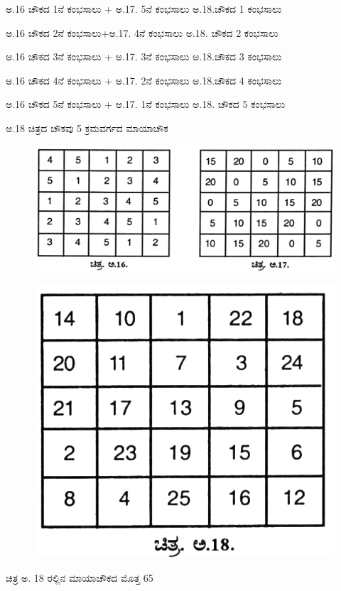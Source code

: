 ಅ.16 ಚೌಕದ 1ನೆ ಕಂಭಸಾಲು + ಅ.17. 5ನೆ ಕಂಭಸಾಲು ಅ.18.ಚೌಕದ 1 ಕಂಭಸಾಲು

ಅ.16 ಚೌಕದ 2ನೆ ಕಂಭಸಾಲು+ಅ.17. 4ನೆ ಕಂಭಸಾಲು ಅ.18. ಚೌಕದ 2 ಕಂಭಸಾಲು

ಅ.16 ಚೌಕದ 3ನೆ ಕಂಭಸಾಲು + ಅ.17. 3ನೆ ಕಂಭಸಾಲು ಅ.18.ಚೌಕದ 3 ಕಂಭಸಾಲು

ಅ.16 ಚೌಕದ 4ನೆ ಕಂಭಸಾಲು + ಅ.17. 2ನೆ ಕಂಭಸಾಲು ಅ.18.ಚೌಕದ 4 ಕಂಭಸಾಲು

ಅ.16 ಚೌಕದ 5ನೆ ಕಂಭಸಾಲು + ಅ.17. 1ನೆ ಕಂಭಸಾಲು ಅ.18. ಚೌಕದ 5 ಕಂಭಸಾಲು

ಅ.18 ಚಿತ್ರದ ಚೌಕವು 5 ಕ್ರಮವರ್ಗದ ಮಾಯಾಚೌಕ
\begin{figure}[H]
\includegraphics{src/figures/chap9/fig9.12.jpg}
\end{figure}
\begin{figure}[H]
\includegraphics{src/figures/chap9/fig9.13.jpg}
\end{figure}

ಚಿತ್ರ ಅ. 18 ರಲ್ಲಿನ ಮಾಯಾಚೌಕದ ಮೊತ್ತ 65

